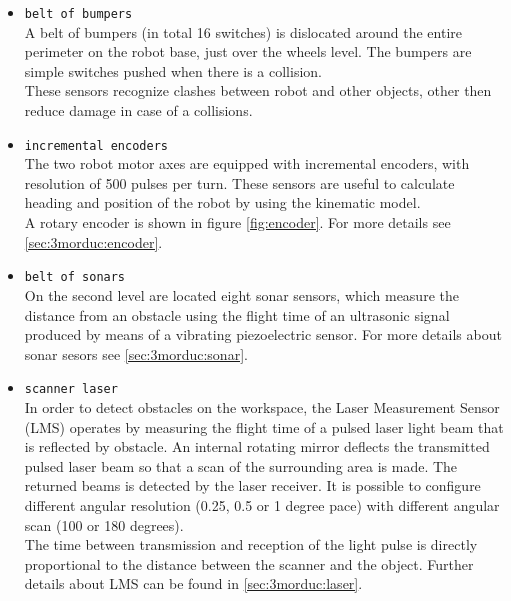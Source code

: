 \begin{itemize}
\item \texttt{belt of bumpers} \\
  A belt of bumpers (in total 16 switches) is dislocated around
  the entire perimeter on the robot base, just over the wheels level.
  The bumpers are simple switches pushed when there is a collision.
  \\
  These sensors recognize clashes between robot and other objects,
  other then reduce damage in case of a collisions.

\item \texttt{incremental encoders} \\
 The two robot motor axes are equipped with incremental encoders, with
 resolution of 500 pulses per turn. These sensors are useful to calculate
 heading and position of the robot by using the kinematic model.  
 \\
 A rotary encoder is shown in figure \ref{fig:encoder}. For more details
 see \ref{sec:3morduc:encoder}.

\item \texttt{belt of sonars} \\
  On the second level are located eight sonar sensors, which measure the
  distance from an obstacle using the flight time of an ultrasonic signal
  produced by means of a vibrating piezoelectric sensor. 
  For more details about sonar sesors see \ref{sec:3morduc:sonar}.

\item \texttt{scanner laser} \\
  In order to detect obstacles on the workspace, the Laser Measurement
  Sensor (LMS) operates by measuring the flight time of a pulsed laser
  light beam that is reflected by obstacle. An internal rotating mirror
  deflects the transmitted pulsed laser beam so that a scan of the
  surrounding area is made. The returned beams is detected by the laser
  receiver. It is possible to configure different angular resolution
  (0.25, 0.5 or 1 degree pace) with different angular scan (100 or 180
  degrees).
  \\
  The time between transmission and reception of the light pulse is directly
  proportional to the distance between the scanner and the object. 
  Further details about LMS can be found in \ref{sec:3morduc:laser}.

\end{itemize}



